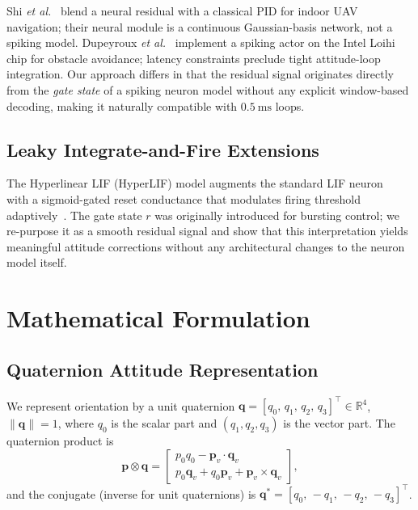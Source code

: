 \documentclass[conference]{IEEEtran}
\begin{document}
Shi \textit{et al.}~\cite{shi2021neural_aug} blend a neural residual with a
classical PID for indoor UAV navigation; their neural module is a continuous
Gaussian-basis network, not a spiking model.
Dupeyroux \textit{et al.}~\cite{dupeyroux2021neuromorphic} implement a spiking
actor on the Intel Loihi chip for obstacle avoidance; latency constraints
preclude tight attitude-loop integration.
Our approach differs in that the residual signal originates directly from the
\emph{gate state} of a spiking neuron model without any explicit window-based
decoding, making it naturally compatible with $\SI{0.5}{\milli\second}$ loops.

\subsection{Leaky Integrate-and-Fire Extensions}

The Hyperlinear LIF (HyperLIF) model augments the standard LIF
neuron~\cite{maass1997lsm} with a sigmoid-gated reset conductance that
modulates firing threshold adaptively~\cite{hyperlif_original}.
The gate state $r$ was originally introduced for bursting control; we
re-purpose it as a smooth residual signal and show that this interpretation
yields meaningful attitude corrections without any architectural changes to the
neuron model itself.

\section{Mathematical Formulation}
\label{sec:formulation}

\subsection{Quaternion Attitude Representation}

We represent orientation by a unit quaternion
$\mathbf{q} = [q_0,\, q_1,\, q_2,\, q_3]^\top \in \mathbb{R}^4$,
$\|\mathbf{q}\| = 1$,
where $q_0$ is the scalar part and $(q_1, q_2, q_3)$ is the vector part.
The quaternion product is
\begin{equation}
  \mathbf{p} \otimes \mathbf{q} =
  \begin{bmatrix}
    p_0 q_0 - \mathbf{p}_v \cdot \mathbf{q}_v \\
    p_0 \mathbf{q}_v + q_0 \mathbf{p}_v + \mathbf{p}_v \times \mathbf{q}_v
  \end{bmatrix},
\end{equation}
and the conjugate (inverse for unit quaternions) is
$\mathbf{q}^* = [q_0,\, -q_1,\, -q_2,\, -q_3]^\top$.
\end{document}
